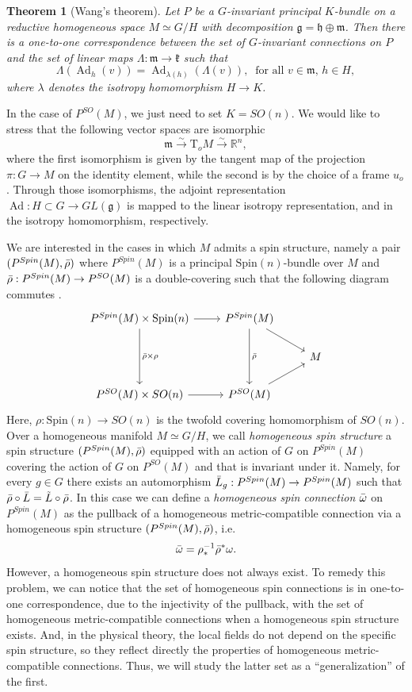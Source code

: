 \documentclass{article}
\numberwithin{equation}{section}
\newtheorem{theorem}{Theorem}[section]
\theoremstyle{definition}
\newcommand{\R}{\mathbb{R}}
\newcommand{\g}{\mathfrak{g}}
\newcommand{\T}{\mathrm{T}}
\newcommand{\OF}[1]{P^{SO}(#1)}
\newcommand{\SP}[1]{P^{Spin}(#1)}
\newcommand{\Ad}{\operatorname{Ad}}
\begin{document}
\begin{theorem}[Wang's theorem]
    Let $P$ be a $G$-invariant principal $K$-bundle on a reductive homogeneous space $M\simeq G/H$ with decomposition $\mathfrak{g}=\mathfrak{h}\oplus \mathfrak{m}$. Then there is a one-to-one correspondence between the set of $G$-invariant connections on $P$ and the set of linear maps $\Lambda:\mathfrak{m}\to\mathfrak{k}$ such that 
    \[\Lambda(\Ad_h(v))=\Ad_{\lambda(h)}(\Lambda(v)),\ \text{ for all }  v\in\mathfrak{m},\, h\in H,\]
    where $\lambda$ denotes the isotropy homomorphism $H\to K$.
\end{theorem}
In the case of $\OF{M}$, we just need to set $K=SO(n)$. We would like to stress that the following vector spaces are isomorphic
\[\mathfrak{m}\xrightarrow{\sim} \T_oM \xrightarrow{\sim}  \R^n,\]
where the first isomorphism is given by the tangent map of the projection $\pi:G\to M$ on the identity element, while the second is by the choice of a frame $u_o$. Through those isomorphisms, the adjoint representation $\Ad:H\subset G \to GL(\g)$ is mapped to the linear isotropy representation, and in the isotropy homomorphism, respectively.

\medskip

We are interested in the cases in which $M$ admits a spin structure, namely a pair $(\SP{M}, \Bar{\rho})$ where $\SP{M}$ is a principal $\mathrm{Spin}(n)$-bundle over $M$ and $\Bar{\rho}:\SP{M}\to\OF{M}$ is a double-covering such that the following diagram commutes \cite{Bar_2024}.
\[
    \begin{tikzcd}
    \SP{M}\times \mathrm{Spin}(n) \arrow[r] \arrow[dd,"\Bar{\rho}\times\rho"] & \SP{M} \arrow[dd,"\Bar{\rho}"]\arrow[rd] & \\
       &   & M\\
    \OF{M}\times SO(n) \arrow[r] & \OF{M} \arrow[ru]& 
    \end{tikzcd}
\]
Here, $\rho:\mathrm{Spin}(n)\to SO(n)$ is the twofold covering homomorphism of $SO(n)$.
Over a homogeneous manifold $M\simeq G/H$, we call \textit{homogeneous spin structure} a spin structure $(\SP{M}, \Bar{\rho})$ equipped with an action of $G$ on $\SP{M}$ covering the action of $G$ on $\OF{M}$ and that is invariant under it. Namely, for every $g\in G$ there exists an automorphism $\Bar{L}_g:\SP{M}\to\SP{M}$ such that $\Bar{\rho}\circ \Bar{L}=\tilde{L}\circ \Bar{\rho}$.
In this case we can define a \textit{homogeneous spin connection} $\Bar{\omega}$ on $\SP{M}$ as the pullback of a homogeneous metric-compatible connection via a homogeneous spin structure $(\SP{M}, \Bar{\rho})$, i.e.\[\Bar{\omega}=\rho_*^{-1}\Bar{\rho}^*\omega.\]
However, a homogeneous spin structure does not always exist. To remedy this problem, we can notice that the set of homogeneous spin connections is in one-to-one correspondence, due to the injectivity of the pullback, with the set of homogeneous metric-compatible connections when a homogeneous spin structure exists. And, in the physical theory, the local fields do not depend on the specific spin structure, so they reflect directly the properties of homogeneous metric-compatible connections. Thus, we will study the latter set as a ``generalization'' of the first.
\end{document}
